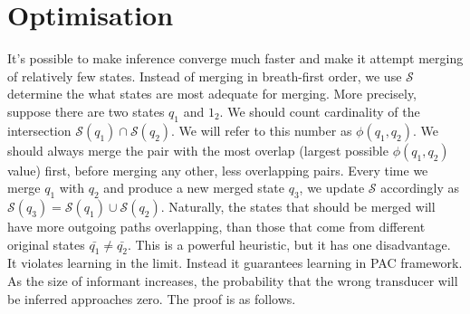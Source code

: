 \iffalse
\section{Optimisation}

It's possible to make inference converge much faster and make it attempt merging of relatively few states. Instead of merging in breath-first order, we use $\mathcal{S}$ determine the what states are most adequate for merging.  More precisely, suppose there are two states $q_1$ and $1_2$. We should count cardinality of the intersection $\mathcal{S}(q_1) \cap \mathcal{S}(q_2)$. We will refer to this number as $\phi(q_1,q_2)$. We should always merge the pair with the most overlap (largest possible $\phi(q_1,q_2)$ value) first, before merging any other, less overlapping pairs. Every time we merge $q_1$ with $q_2$ and produce a new merged state $q_3$, we update $\mathcal{S}$ accordingly as $\mathcal{S}(q_3)=\mathcal{S}(q_1) \cup \mathcal{S}(q_2)$. Naturally, the states that should be merged will have more outgoing paths overlapping, than those that come from different original states $\bar{q_1}\ne\bar{q_2}$. This is a powerful heuristic, but it has one disadvantage. It violates learning in the limit. Instead it guarantees learning in PAC framework. As the size of informant increases, the probability that the wrong transducer will be inferred approaches zero. The proof is as follows.

